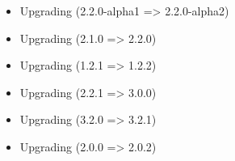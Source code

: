 \begin{itemize}
        \item Upgrading  (2.2.0-alpha1 => 2.2.0-alpha2)
        \item Upgrading  (2.1.0 => 2.2.0)
        \item Upgrading  (1.2.1 => 1.2.2)
        \item Upgrading  (2.2.1 => 3.0.0)
        \item Upgrading  (3.2.0 => 3.2.1)
        \item Upgrading  (2.0.0 => 2.0.2)
    \end{itemize}


